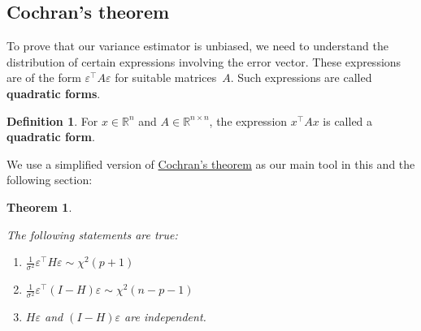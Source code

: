 \documentclass[
  a4paper,
]{article}
\newtheorem{theorem}{Theorem}[section]
\theoremstyle{definition}
\newtheorem{definition}{Definition}[section]
\theoremstyle{definition}
\theoremstyle{definition}
\theoremstyle{definition}
\theoremstyle{remark}
\begin{document}
\subsection{Cochran's theorem}\label{Cochran}

To prove that our variance estimator is unbiased, we need to understand the
distribution of certain expressions involving the error vector. These
expressions are of the form \(\varepsilon^\top A \varepsilon\) for suitable matrices~\(A\).
Such expressions are called \textbf{quadratic forms}.

\begin{definition}
For \(x\in\mathbb{R}^n\) and \(A\in\mathbb{R}^{n\times n}\), the expression
\(x^\top A x\) is called a \textbf{quadratic form}.
\end{definition}

We use a simplified version of \href{https://en.wikipedia.org/wiki/Cochran\%27s_theorem}{Cochran's theorem}
as our main tool in this and the following section:

\begin{theorem}
\protect\hypertarget{thm:Cochran}{}\label{thm:Cochran}

The following statements are true:

\begin{enumerate}
\def\labelenumi{\arabic{enumi})}
\item
  \(\frac{1}{\sigma^2} \varepsilon^\top H \varepsilon\sim \chi^2(p+1)\)
\item
  \(\frac{1}{\sigma^2} \varepsilon^\top (I - H) \varepsilon\sim \chi^2(n - p - 1)\)
\item
  \(H \varepsilon\) and \((I-H)\varepsilon\) are independent.
\end{enumerate}

\end{theorem}
\end{document}
